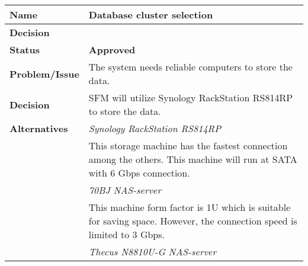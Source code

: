 \begin{table}[H]
	\begin{tabular}{L{0.2\textwidth} L{0.6\textwidth}}
		\textbf{Name}           & \textbf{Database cluster selection} \\ \toprule
		\textbf{Decision}       & \textbf{} \\ \midrule
		\textbf{Status}         & \textbf{Approved} \\ \midrule
		\textbf{Problem/Issue}  & The system needs reliable computers to store the data.\\ \midrule
		\textbf{Decision}       & SFM will utilize Synology RackStation RS814RP to store the data.\\ \midrule
		\textbf{Alternatives}   & \textit{Synology RackStation RS814RP}\\
		& This storage machine has the fastest connection among the others. This machine will run at SATA with 6 Gbps connection.\\
		& \textit{70BJ NAS-server}\\
		& This machine form factor is 1U which is suitable for saving space. However, the connection speed is limited to 3 Gbps.\\
		& \textit{Thecus N8810U-G NAS-server} \\

\end{tabular}
\end{table}
